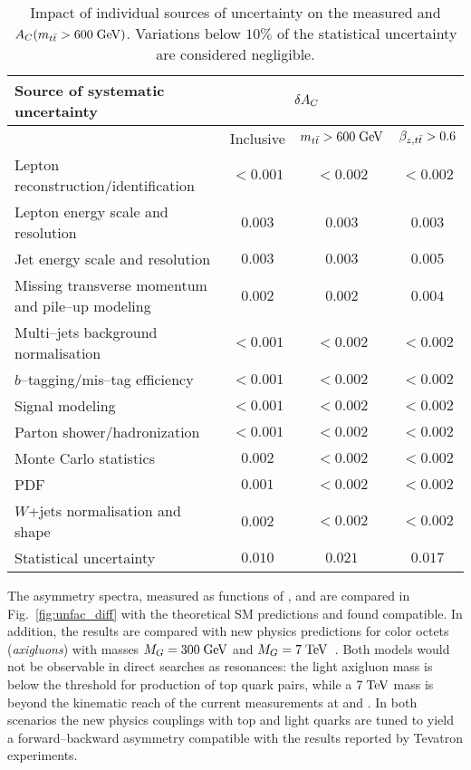 \begin{table}[!htb]\centering
\begin{tabular}{l c c c}
\toprule
Source of systematic uncertainty  & \multicolumn{2}{c}{$\delta{\mbox{$A_C$}{}}$} \\
\midrule
  & Inclusive & $\mbox{$m_{t\bar{t}}$}{} >600\; \mathrm{GeV}{}$ & $\mbox{$\beta_{z,t\bar{t}}$}{}>0.6$ \\
\midrule
Lepton reconstruction/identification    & $<0.001$ & $<0.002$ & $<0.002$\\
Lepton energy scale and resolution      & $0.003$    & $0.003$   &  $0.003$\\
Jet energy scale and resolution             & $0.003$    & $0.003$   &
$0.005$ \\
Missing transverse momentum and pile--up modeling & $0.002$ & $0.002$
& $0.004$\\
Multi--jets background normalisation    & $<0.001$ & $<0.002$ & $<0.002$\\
$b$--tagging/mis--tag efficiency         & $<0.001$  & $<0.002$ & $<0.002$\\
Signal modeling                                       & $<0.001$ &
$<0.002$ & $<0.002$\\
Parton shower/hadronization             & $<0.001$  & $<0.002$ & $<0.002$\\
Monte Carlo statistics                         & $0.002$  & $<0.002$ & $<0.002$\\
PDF                                                      & $0.001$  & $<0.002$  & $<0.002$\\
$W$+jets normalisation and shape     & $0.002$  & $<0.002$ & $<0.002$\\
\midrule
Statistical uncertainty                          & $0.010$ & $0.021$ & $0.017$\\
\bottomrule
\end{tabular}
\caption{Impact of individual sources of uncertainty on the measured
  \ac{} and $\mbox{$A_C$}{}(\mbox{$m_{t\bar{t}}$}{}>600 \; \mathrm{GeV}{})$. Variations below $10\%$ of the
  statistical uncertainty are considered negligible.}
\label{tab:systematics}
\end{table}

The asymmetry spectra, measured as functions of
\mtt{}, \pttt{} and \ytt{} are compared in Fig.~\ref{fig:unfac_diff}
with the theoretical SM predictions and found compatible. 
In addition, the results are compared with new physics predictions for
color octets ({\it axigluons}) with masses $M_G=300 \; \mathrm{GeV}{}$ and $M_G=7
\; \mathrm{TeV}{}$~\cite{Ferrario:2009bz,Frampton:2009rk}. Both models would not
be observable in direct searches as \ttbar{} resonances: the light
axigluon mass is below the threshold for production of top quark
pairs, while a $7 \; \mathrm{TeV}$ mass is beyond the kinematic reach of the
current measurements at \seventev{} and \eighttev{}. In both scenarios
the new physics couplings with top and light quarks are tuned to yield a
forward--backward asymmetry compatible with the results reported by
Tevatron experiments.

